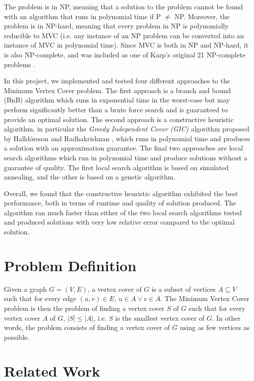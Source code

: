 \documentclass[acmlarge]{acmart}
\begin{document}
The problem is in NP, meaning that a solution to the problem cannot be found with an algorithm that runs in polynomial time if P $\neq$ NP. Moreover, the problem is in NP-hard, meaning that every problem in NP is polynomially reducible to MVC (i.e. any instance of an NP problem can be converted into an instance of MVC in polynomial time). Since MVC is both in NP and NP-hard, it is also NP-complete, and was included as one of Karp's original 21 NP-complete problems \cite{karp1972reducibility}.

In this project, we implemented and tested four different approaches to the Minimum Vertex Cover problem. The first approach is a branch and bound (BnB) algorithm which runs in exponential time in the worst-case but may perform significantly better than a brute force search and is guaranteed to provide an optimal solution. The second approach is a constructive heuristic algorithm, in particular the \textit{Greedy Independent Cover (GIC)} algorithm proposed by Halld\'{o}rsson and Radhakrishnan \cite{Hall97}, which runs in polynomial time and produces a solution with an approximation guarantee. The final two approaches are local search algorithms which run in polynomial time and produce solutions without a guarantee of quality. The first local search algorithm is based on simulated annealing, and the other is based on a genetic algorithm.

Overall, we found that the constructive heuristic algorithm exhibited the best performance, both in terms of runtime and quality of solution produced. The algorithm ran much faster than either of the two local search algorithms tested and produced solutions with very low relative error compared to the optimal solution. 


\section{Problem Definition}

Given a graph $G = (V,E)$, a vertex cover of $G$ is a subset of vertices $A \subseteq V$ such that for every edge $(u,v) \in E$, $u \in A \lor v \in A$. The Minimum Vertex Cover problem is then the problem of finding a vertex cover $S$ of $G$ such that for every vertex cover $A$ of $G$, $|S| \leq |A|$, i.e. $S$ is the smallest vertex cover of $G$. In other words, the problem consists of finding a vertex cover of $G$ using as few vertices as possible.

\section{Related Work}
\end{document}
